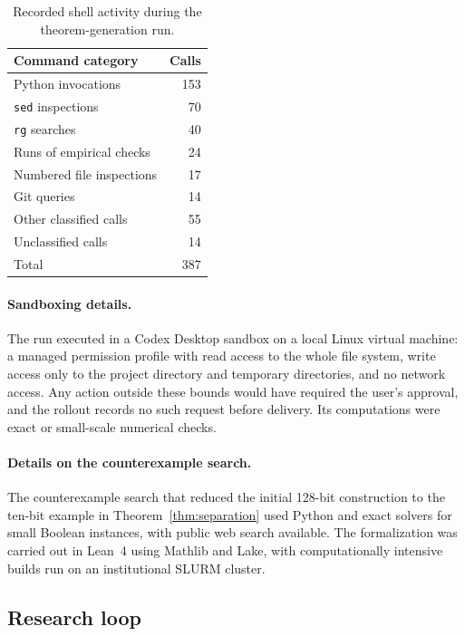 \documentclass{article}
\theoremstyle{definition}
\theoremstyle{plain}
\begin{document}
\begin{table}[H]
  \caption{Recorded shell activity during the theorem-generation run.}
  \label{tab:tool-usage}
  \centering
  \small
  \begin{tabular}{lr}
    \toprule
    Command category & Calls \\
    \midrule
    Python invocations & 153 \\
    \texttt{sed} inspections & 70 \\
    \texttt{rg} searches & 40 \\
    Runs of empirical checks & 24 \\
    Numbered file inspections & 17 \\
    Git queries & 14 \\
    Other classified calls & 55 \\
    Unclassified calls & 14 \\
    \midrule
    Total & 387 \\
    \bottomrule
  \end{tabular}
\end{table}

\paragraph{Sandboxing details.} The run executed in a Codex Desktop sandbox on a local Linux virtual machine: a managed permission profile with read access to the whole file system, write access only to the project directory and temporary directories, and no network access. Any action outside these bounds would have required the user's approval, and the rollout records no such request before delivery. Its computations were exact or small-scale numerical checks.

\paragraph{Details on the counterexample search.} The counterexample search that reduced the initial 128-bit construction to the ten-bit example in Theorem~\ref{thm:separation} used Python and exact solvers for small Boolean instances, with public web search available. The formalization was carried out in Lean~4 using Mathlib and Lake, with computationally intensive builds run on an institutional SLURM cluster.

\subsection{Research loop}
\end{document}
